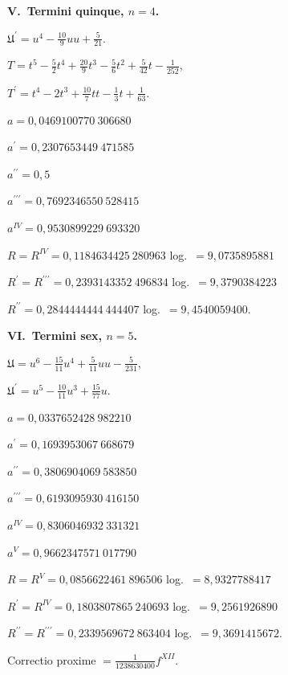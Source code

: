 \documentclass[12pt,a4paper]{article}
\newcommand{\UU}{\mathfrak{U}}
\begin{document}
\medskip

\textbf{V.\ Termini quinque, $n = 4$.}

\medskip

$\UU^\prime = u^4 - \tfrac{10}{9}uu + \tfrac{5}{21}$.

$T = t^5 - \tfrac{5}{2}t^4 + \tfrac{20}{9}t^3 - \tfrac{5}{6}t^2 + \tfrac{5}{42}t - \tfrac{1}{252}$,

$T^\prime = t^4 - 2t^3 + \tfrac{10}{7}tt - \tfrac{1}{3}t + \tfrac{1}{63}$.

$a = 0{,}0469100770\ 306680$

$a^\prime = 0{,}2307653449\ 471585$

$a^{\prime\prime} = 0{,}5$

$a^{\prime\prime\prime} = 0{,}7692346550\ 528415$

$a^{IV} = 0{,}9530899229\ 693320$

$R = R^{IV} = 0{,}1184634425\ 280963$ \quad log.\ $= 9{,}0735895881$

$R^\prime = R^{\prime\prime\prime} = 0{,}2393143352\ 496834$ \quad log.\ $= 9{,}3790384223$

$R^{\prime\prime} = 0{,}2844444444\ 444407$ \quad log.\ $= 9{,}4540059400$.

\medskip

\textbf{VI.\ Termini sex, $n = 5$.}

\medskip

$\UU = u^6 - \tfrac{15}{11}u^4 + \tfrac{5}{11}uu - \tfrac{5}{231}$,

$\UU^\prime = u^5 - \tfrac{10}{11}u^3 + \tfrac{15}{77}u$.

$a = 0{,}0337652428\ 982210$

$a^\prime = 0{,}1693953067\ 668679$

$a^{\prime\prime} = 0{,}3806904069\ 583850$

$a^{\prime\prime\prime} = 0{,}6193095930\ 416150$

$a^{IV} = 0{,}8306046932\ 331321$

$a^V = 0{,}9662347571\ 017790$

$R = R^V = 0{,}0856622461\ 896506$ \quad log.\ $= 8{,}9327788417$

$R^\prime = R^{IV} = 0{,}1803807865\ 240693$ \quad log.\ $= 9{,}2561926890$

$R^{\prime\prime} = R^{\prime\prime\prime} = 0{,}2339569672\ 863404$ \quad log.\ $= 9{,}3691415672$.

Correctio proxime $= \tfrac{1}{1238630400} f^{XII}$.

\medskip
\end{document}
